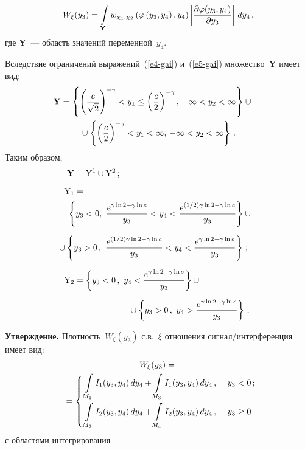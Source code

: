 \begin{multicols}{2}
\noindent
\begin{equation*}
W_{\xi}(y_3) =\int\limits_{\mathbf{Y}} w_{\chi_1,\chi_2}\left( \varphi\left( 
y_3,y_4\right),y_4\right)  \left\vert \displaystyle\frac{\displaystyle \partial\varphi(y_3,y_4)\mathstrut}{\displaystyle \partial 
y_3\mathstrut}\right\vert \, dy_4\,,
\end{equation*}
где $\mathbf{Y}$~--- область значений переменной~$y_4$.

Вследствие ограничений выражений~(\ref{e4-gai}) и~(\ref{e5-gai}) 
множество~$\mathbf{Y}$ имеет вид: 
\begin{multline*}
\hspace*{-4mm}\mathbf{Y}=\left\{ \left( \fr{c}{\sqrt{2}}\right)^{-\gamma} <y_1 \leq 
\left( \fr{c}{2}\right)^{-\gamma},\,
-\infty <y_2<\infty\right\}\cup{}\\
{}\cup \left\{ \left( \fr{c}{2}\right)^{-\gamma}< y_1<\infty,\,
-\infty<y_2<\infty\right\}\,.
\end{multline*}
Таким образом, 
\begin{align*}
\mathbf{Y} &= \mathrm{Y}^1\cup \mathrm{Y}^2\,;\\[6pt]
\mathrm{Y}_1 &={}\\[1pt]
&\hspace*{-7mm}{}= \left\{ y_3<0,\ \fr{e^{\gamma\ln 2-\gamma \ln c}}{y_3}<
y_4<\fr{e^{(1/2)\gamma\ln 2- \gamma \ln c}}{y_3}\right\} \cup{}\\[6pt]
&\hspace*{-7mm}{}\cup \left\{ y_3>0\,,\
\fr{e^{(1/2)\gamma\ln 2-\gamma\ln c}}{y_3}<y_4<\fr{e^{\gamma\ln 2-\gamma \ln c}}{y_3}\right\}\,;\\[6pt]
\mathrm{Y}_2 &= \left\{ y_3<0\,,\ y_4<\fr{e^{\gamma\ln 2-\gamma \ln c}}{y_3}\right\}
 \cup {}\\[6pt]
 &\hspace*{22.5mm}{}\cup  \left\{ y_3>0\,,\ y_4>\fr{e^{\gamma\ln 2- \gamma\ln c}}{y_3}\right\}\,.
 \end{align*}


\noindent
\textbf{Утверждение.} Плотность~$W_\xi(y_3)$ с.в.~$\xi$ отношения 
сигнал/интерференция имеет вид:
\begin{multline*}
W_\xi (y_3) = {}\\
{}=\begin{cases}
\displaystyle \,\int\limits_{M_1} I_1(y_3, y_4)\,dy_4+\int\limits_{M_3} I_1(y_3,y_4)\,dy_4\,, &\ y_3<0\,;\\[16pt]
\displaystyle \,\int\limits_{M_2} I_2(y_3, y_4)\,dy_4+\int\limits_{M_4} I_2(y_3,y_4)\,dy_4\,, &\ y_3\geq0
\end{cases}\hspace*{-3.75pt}
\end{multline*}
с областями интегрирования


\end{multicols}
